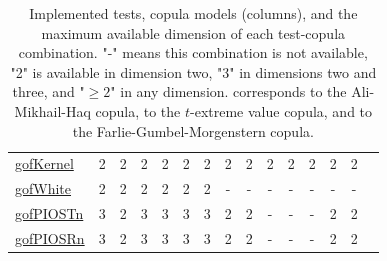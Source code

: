 \begin{table}[H]
\begin{adjustbox}{max width=\textwidth}
\begin{tabular}{lcccccccccccccc}
  \hyperref[subsec:gof_Kernel]{gofKernel} & 2 & 2 & 2 & 2 & 2 & 2 & 2 & 2 & 2 & 2 & 2 & 2 & 2\\
  \hyperref[subsec:gof_White]{gofWhite} & 2 & 2 & 2 & 2 & 2 & 2 & - & - & - & - & - & - & -\\ 
  \hyperref[subsec:gof_PIOS]{gofPIOSTn} & 3 & 2 & 3 & 3 & 3 & 3 & 2 & 2 & - & - & - & 2 & 2\\ 
  \hyperref[subsec:gof_PIOS]{gofPIOSRn} & 3 & 2 & 3 & 3 & 3 & 3 & 2 & 2 & - & - & - & 2 & 2\\ 
\bottomrule
\end{tabular}
\end{adjustbox}
\caption{\mycolor Implemented tests, copula models (columns), and the maximum available dimension of each test-copula combination. "-" means this combination is not available, "2" is available in dimension two, "3" in dimensions two and three, and "$\geq2$" in any dimension.  corresponds to the Ali-Mikhail-Haq copula,  to the $t$-extreme value copula, and  to the Farlie-Gumbel-Morgenstern copula.}
\label{tab:Combs_tests_cops_dims}
\end{table}


